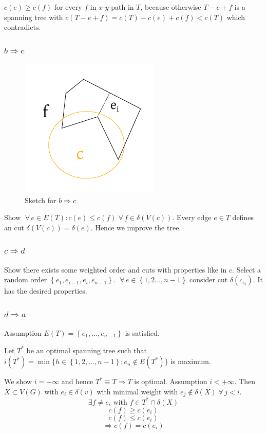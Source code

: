 \documentclass{article}
\newcommand{\set}[1]{\left\{#1\right\}}
\newcommand{\gath}[2]{$#1$-$#2$-path} %
\newcommand{\fall}{\;\forall\,}
\begin{document}
$c(e) \geq c(f)$
for every $f$ in \gath xy in $T$, because otherwise $T - e + f$ is a spanning tree with $c(T - e  + f) = c(T) - c(e) + c(f) < c(T)$ which contradicts.

\subsubsection{$b \Rightarrow c$}
%
\begin{figure}[t]
  \begin{center}
    \includegraphics{img/bc.pdf}
    \caption{Sketch for $b \Rightarrow c$}
  \end{center}
\end{figure}

Show $\fall e \in E(T): c(e) \leq c(f) \fall f \in \delta(V(c))$. Every edge $e \in T$ defines an cut $\delta(V(c)) = \delta(e)$. Hence we improve the tree.

\subsubsection{$c \Rightarrow d$}
%
Show there exists some weighted order and cuts with properties like in $c$. Select a random order $\set{e_1, e_{i-1}, e_i, e_{n-1}}$. $\fall e \in \set{1, 2 \ldots, n-1}$ consider cut $\delta(c_{e_i})$. It has the desired properties.

\subsubsection{$d \Rightarrow a$}
%
Assumption $E(T) = \set{e_1, \ldots, e_{n-1}}$ is satisfied.

Let $T^*$ be an optimal spanning tree such that $i(T^*) = \min\{h \in \set{1, 2, \ldots, n-1}: e_n \notin E(T^*)\}$ is maximum.

We show $i = +\infty$ and hence $T^* \equiv T \Rightarrow T$ is optimal.
Assumption $i < +\infty$. Then $X \subset V(G)$ with $e_i \in \delta(v)$ with minimal weight with $e_j \notin \delta(X) \fall j < i$.
\[
  \exists f \neq e_i \text{ with } f \in T^* \cap \delta(X)
\] \[
  c(f) \geq c(e_i)
\] \[
  c(f) \leq c(e_i)
\] \[
  \Rightarrow c(f) = c(e_i)
\]
\end{document}

